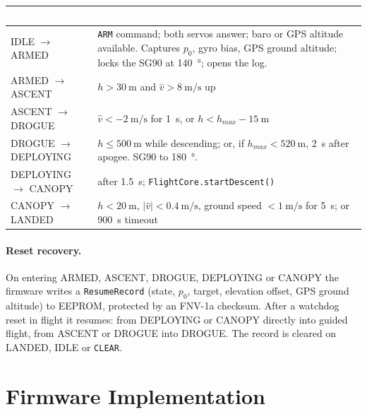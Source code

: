 \documentclass[11pt,a4paper]{article}
\newcommand{\hdr}[1]{\textcolor{white}{\textbf{#1}}}
\newcommand{\code}[1]{\texttt{#1}}
\begin{document}
\begin{center}
\small
\renewcommand{\arraystretch}{1.2}
\begin{tabularx}{\linewidth}{p{3.2cm}Y}
\toprule
{}\hdr{Transition} & \hdr{Condition} \\
\midrule
IDLE $\to$ ARMED & \code{ARM} command; both servos answer; baro or GPS altitude available. Captures $p_0$, gyro bias, GPS ground altitude; locks the SG90 at \SI{140}{\degree}; opens the log. \\
ARMED $\to$ ASCENT & $h > \SI{30}{\meter}$ and $\hat v > \SI{8}{\meter\per\second}$ up \\
ASCENT $\to$ DROGUE & $\hat v < -\SI{2}{\meter\per\second}$ for \SI{1}{\second}, or $h < h_{max} - \SI{15}{\meter}$ \\
DROGUE $\to$ DEPLOYING & $h \le \SI{500}{\meter}$ while descending; or, if $h_{max} < \SI{520}{\meter}$, \SI{2}{\second} after apogee. SG90 to \SI{180}{\degree}. \\
DEPLOYING $\to$ CANOPY & after \SI{1.5}{\second}; \code{FlightCore.startDescent()} \\
CANOPY $\to$ LANDED & $h < \SI{20}{\meter}$, $|\hat v| < \SI{0.4}{\meter\per\second}$, ground speed $< \SI{1}{\meter\per\second}$ for \SI{5}{\second}; or \SI{900}{\second} timeout \\
\bottomrule
\end{tabularx}
\end{center}

\paragraph{Reset recovery.} On entering ARMED, ASCENT, DROGUE, DEPLOYING or
CANOPY the firmware writes a \code{ResumeRecord} (state, $p_0$, target,
elevation offset, GPS ground altitude) to EEPROM, protected by an FNV-1a
checksum. After a watchdog reset in flight it resumes: from DEPLOYING or
CANOPY directly into guided flight, from ASCENT or DROGUE into DROGUE. The
record is cleared on LANDED, IDLE or \code{CLEAR}.

\section{Firmware Implementation}
\end{document}
